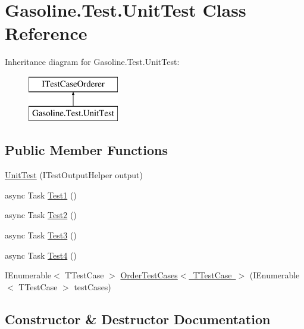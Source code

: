 \hypertarget{class_gasoline_1_1_test_1_1_unit_test}{}\section{Gasoline.\+Test.\+Unit\+Test Class Reference}
\label{class_gasoline_1_1_test_1_1_unit_test}
Inheritance diagram for Gasoline.\+Test.\+Unit\+Test\+:\begin{figure}[H]
\begin{center}
\leavevmode
\includegraphics[height=2.000000cm]{class_gasoline_1_1_test_1_1_unit_test}
\end{center}
\end{figure}
\subsection*{Public Member Functions}
\begin{DoxyCompactItemize}
\item 
\mbox{\hyperlink{class_gasoline_1_1_test_1_1_unit_test_ab188016915412ba7fdc46c9b45e9029a}{Unit\+Test}} (I\+Test\+Output\+Helper output)
\item 
async Task \mbox{\hyperlink{class_gasoline_1_1_test_1_1_unit_test_ac62b1e58dd412651cd4776ff6ea5b564}{Test1}} ()
\item 
async Task \mbox{\hyperlink{class_gasoline_1_1_test_1_1_unit_test_aabdb54bc89a4d9fc26732e095c0fc06f}{Test2}} ()
\item 
async Task \mbox{\hyperlink{class_gasoline_1_1_test_1_1_unit_test_a283897be13070c1325c833fe2b4d28b3}{Test3}} ()
\item 
async Task \mbox{\hyperlink{class_gasoline_1_1_test_1_1_unit_test_a17f40333cb67d58ceff0ef4a4d3f48d2}{Test4}} ()
\item 
I\+Enumerable$<$ T\+Test\+Case $>$ \mbox{\hyperlink{class_gasoline_1_1_test_1_1_unit_test_a35942fc791655bbcc42672f9729fb393}{Order\+Test\+Cases$<$ T\+Test\+Case $>$}} (I\+Enumerable$<$ T\+Test\+Case $>$ test\+Cases)
\end{DoxyCompactItemize}


\subsection{Constructor \& Destructor Documentation}
\mbox{\label{class_gasoline_1_1_test_1_1_unit_test_ab188016915412ba7fdc46c9b45e9029a}} 
